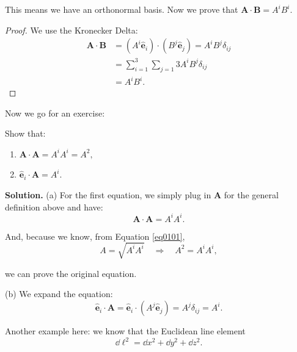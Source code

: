 \documentclass[../main.tex]{subfiles}
\begin{document}
	This means we have an orthonormal basis. Now we prove that $\mathbf{A} \cdot \mathbf{B} = A^{i}B^{i}$. 
	\begin{proof}
		We use the Kronecker Delta:
		\begin{equation}
		  \begin{aligned}
		  \mathbf{A} \cdot \mathbf{B} &= (A^{i}\hat{\mathbf{e}}_{i}) \cdot (B^{j}\hat{\mathbf{e}}_{j}) = A^{i}B^{j}\delta_{ij} \\[2mm]
		  &= \sum_{i=1}^{3} \sum_{j=1}{3} A^{i}B^{j}\delta_{ij} \\[2mm]
		  &= A^{i}B^{i}.
		  \end{aligned} 
		\end{equation}
	\end{proof}

	Now we go for an exercise:
	\begin{exercise}
		Show that:
		\begin{enumerate}
			\item {$\mathbf{A} \cdot \mathbf{A} = A^{i}A^{i} = A^{2},$}
			\item {$\hat{\mathbf{e}}_{i} \cdot \mathbf{A} = A^{i}.$}
		\end{enumerate}

		\vspace{1\baselineskip}
		\textbf{Solution.} (a) For the first equation, we simply plug in $\mathbf{A}$ for the general definition above and have:
		\begin{equation}
		  \mathbf{A} \cdot \mathbf{A} = A^{i}A^{i}.
		\end{equation}

		And, because we know, from Equation \ref{eq0101},
		\begin{equation}
		  A = \sqrt{A^{i}A^{i}} \quad \Rightarrow \quad A^{2} = A^{i}A^{i},
		\end{equation}

		we can prove the original equation.

		\vspace{1\baselineskip}
		(b) We expand the equation:
		\begin{equation}
		  \hat{\mathbf{e}}_{i} \cdot \mathbf{A} = \hat{\mathbf{e}}_{i} \cdot (A^{j}\hat{\mathbf{e}}_{j}) = A^{j}\delta_{ij} = A^{i}.
		\end{equation}
	\end{exercise}

	Another example here: we know that the Euclidean line element
	\begin{equation}
	  \dd \ell ^{2} = \dd x^{2} + \dd y^{2} + \dd z^{2}.
	\end{equation}
\end{document}
